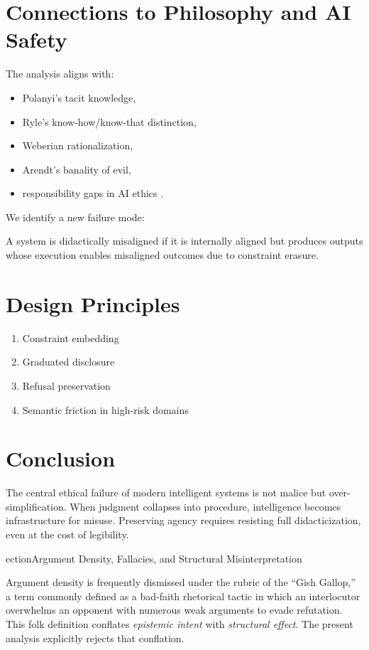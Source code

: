 \section{Connections to Philosophy and AI Safety}

The analysis aligns with:
\begin{itemize}
\item Polanyi’s tacit knowledge,
\item Ryle’s know-how/know-that distinction,
\item Weberian rationalization,
\item Arendt’s banality of evil,
\item responsibility gaps in AI ethics \cite{matthias}.
\end{itemize}

We identify a new failure mode:

\begin{definition}
A system is didactically misaligned if it is internally aligned but produces outputs whose execution enables misaligned outcomes due to constraint erasure.
\end{definition}

\section{Design Principles}

\begin{enumerate}
\item Constraint embedding
\item Graduated disclosure
\item Refusal preservation
\item Semantic friction in high-risk domains
\end{enumerate}

\section{Conclusion}

The central ethical failure of modern intelligent systems is not malice but over-simplification. When judgment collapses into procedure, intelligence becomes infrastructure for misuse. Preserving agency requires resisting full didacticization, even at the cost of legibility.

ection{Argument Density, Fallacies, and Structural Misinterpretation}
\label{sec:density}

Argument density is frequently dismissed under the rubric of the ``Gish Gallop,'' a term commonly defined as a bad-faith rhetorical tactic in which an interlocutor overwhelms an opponent with numerous weak arguments to evade refutation. This folk definition conflates \emph{epistemic intent} with \emph{structural effect}. The present analysis explicitly rejects that conflation.

